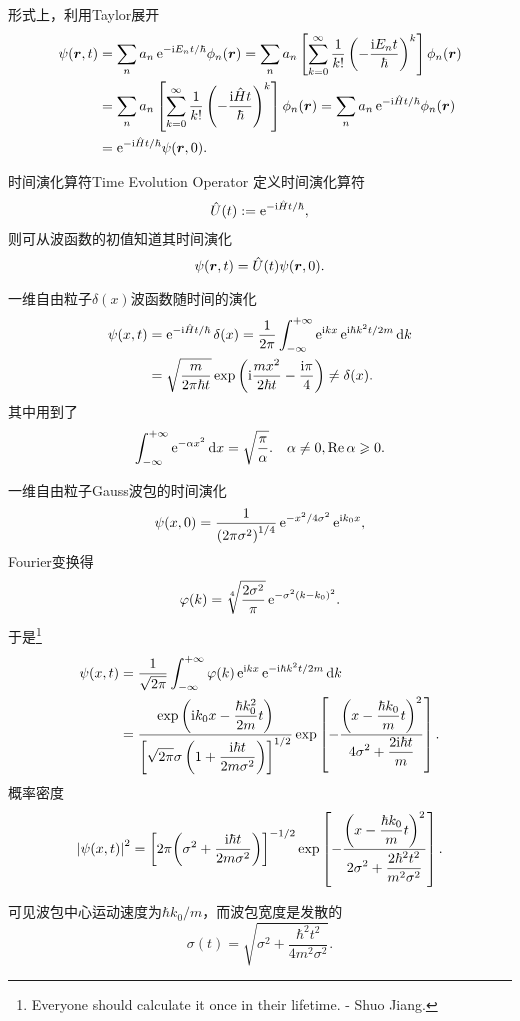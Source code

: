 形式上，利用Taylor展开
\begin{align*}
	\psi(\bm r,t) & =\sum_na_n\mathop{}\!\mathrm{e}^{-\mathrm{i} E_nt/\hbar}\phi_n(\bm r)=\sum_na_n\left[\sum_{k=0}^\infty\frac1{k!}\left(-\frac{\mathrm{i} E_nt}\hbar\right)^k\right]\phi_n(\bm r)     \\
	           & =\sum_na_n\left[\sum_{k=0}^\infty\frac1{k!}\left(-\frac{\mathrm{i}\hat Ht}\hbar\right)^k\right]\phi_n(\bm r)=\sum_na_n\mathop{}\!\mathrm{e}^{-\mathrm{i}\hat Ht/\hbar}\phi_n(\bm r) \\
	           & =\mathop{}\!\mathrm{e}^{-\mathrm{i}\hat Ht/\hbar}\psi(\bm r,0).
\end{align*}
\begin{definition}{时间演化算符}{Time Evolution Operator}
	定义时间演化算符
	\begin{align}
		\hat U(t):=\mathop{}\!\mathrm{e}^{-\mathrm{i}\hat Ht/\hbar},
	\end{align}
	则可从波函数的初值知道其时间演化
	\[
		\psi(\bm r,t)=\hat U(t)\psi(\bm r,0).
\]
\end{definition}
\begin{example}
	{一维自由粒子$\delta(x)$波函数随时间的演化}{}
	\begin{equation*}
		\begin{aligned}
			\psi(x,t) & =\mathop{}\!\mathrm{e}^{-\mathrm{i}\hat Ht/\hbar}\mathop{}\!\delta(x)=\frac1{2\pi}\int_{-\infty}^{+\infty}\mathop{}\!\mathrm{e}^{\mathrm{i} kx}\mathop{}\!\mathrm{e}^{\mathrm{i}\hbar k^2t/2m}\mathop{}\!\mathrm{d} k      \\
			          & =\sqrt{\frac m{2\pi\hbar t}}\exp\left(\mathrm{i}\frac{mx^2}{2\hbar t}-\frac{\mathrm{i}\pi}4\right)\neq\mathop{}\!\delta(x).
		\end{aligned}
	\end{equation*}
	其中用到了
	\begin{align}
		\int_{-\infty}^{+\infty}\mathop{}\!\mathrm{e}^{-\alpha x^2}\mathop{}\!\mathrm{d} x=\sqrt{\frac\pi\alpha}.\quad\alpha\neq 0,\operatorname{Re}\alpha\geqslant 0.
	\end{align}
\end{example}
\begin{example}
	{一维自由粒子Gauss波包的时间演化}{}
	\[
		\psi(x,0)=\frac1{\left(2\pi\sigma^2\right)^{1/4}}\mathop{}\!\mathrm{e}^{-x^2/4\sigma^2}\mathop{}\!\mathrm{e}^{\mathrm{i} k_0x},
	\]
	Fourier变换得
	\[
		\varphi(k)=\sqrt[4]{\frac{2\sigma^2}{\pi}}\mathop{}\!\mathrm{e}^{-\sigma^2(k-k_0)^2}.
	\]%
	于是\footnote{Everyone should calculate it once in their lifetime. - Shuo Jiang.}
	\begin{align*}
		\psi(x,t) & =\frac1{\sqrt{2\pi}}\int_{-\infty}^{+\infty}\varphi(k)\mathop{}\!\mathrm{e}^{\mathrm{i} kx}\mathop{}\!\mathrm{e}^{-\mathrm{i}\hbar k^2t/2m}\mathop{}\!\mathrm{d} k                                                                                                                            \\
		          & =\frac{\displaystyle \exp\left(\mathrm{i} k_0x-\frac{\hbar k_0^2}{2m}t\right)}{\displaystyle \left[\sqrt{2\pi}\sigma\left(1+\frac{\mathrm{i}\hbar t}{2m\sigma^2}\right)\right]^{1/2}}\exp\left[-\frac{\displaystyle \left(x-\frac{\hbar k_0}mt\right)^2}{\displaystyle 4\sigma^2+\frac{2\mathrm{i}\hbar t}m}\right].
	\end{align*}
	概率密度
	\begin{align*}
		\left\lvert\psi(x,t)\right\rvert^2=\left[2\pi\!\left(\sigma^2+\frac{\mathrm{i}\hbar t}{2m\sigma^2}\right)\right]^{-1/2}\exp\left[-\frac{\displaystyle \left(x-\frac{\hbar k_0}mt\right)^2}{\displaystyle 2\sigma^2+\frac{2\hbar^2 t^2}{m^2\sigma^2}}\right].
	\end{align*}
	
	可见波包中心运动速度为$\hbar k_0/m$，而波包宽度是发散的
	\[
		\sigma(t)=\sqrt{\sigma^2+\frac{\hbar^2t^2}{4m^2\sigma^2}}.
	\]
\end{example}
